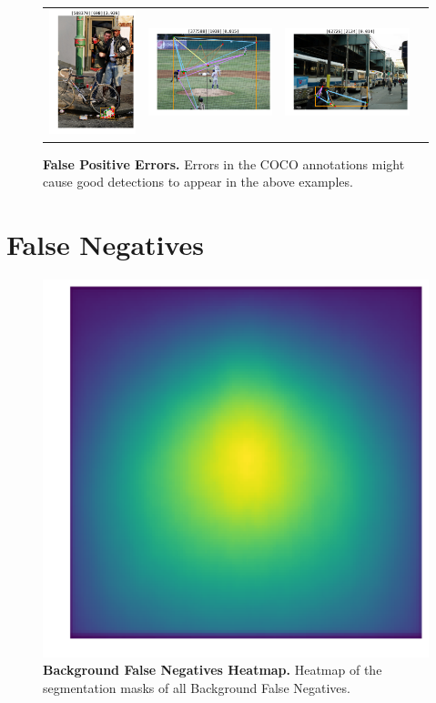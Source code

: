 \documentclass[10pt,onecolumn,letterpaper]{article}
\begin{document}
\begin{figure}[h!]
{\begin{tabular}{cc|cc}
\includegraphics[width=.25\linewidth,height=.15\paperwidth,keepaspectratio]{./result/rmpe/background_errors/false_positives/bckd_false_pos_3.pdf} &
\includegraphics[width=.25\linewidth,height=.15\paperwidth,keepaspectratio]{./result/rmpe/background_errors/false_positives/bckd_false_pos_6.pdf} &
\includegraphics[width=.25\linewidth,height=.15\paperwidth,keepaspectratio]{./result/rmpe/background_errors/false_positives/bckd_false_pos_7.pdf}\\
\end{tabular}
}
\vspace{-3mm}
\caption{ {\small \textbf{False Positive Errors.}
Errors in the COCO annotations might cause good detections to appear in the above examples.}}
\end{figure}
\clearpage

\section{False Negatives}

\begin{figure}[h!]
\centering
\includegraphics[width=.25\linewidth]{./result/rmpe/background_errors/false_negatives/bckd_false_neg_heatmaps.pdf}
\caption{ {\small \textbf{Background False Negatives Heatmap.} Heatmap of the segmentation masks of all Background False Negatives.}}
\end{figure}
\end{document}
